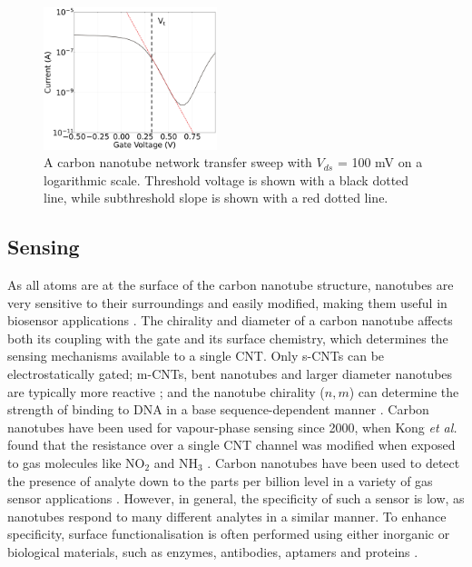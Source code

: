 \documentclass[
  a4paper,
]{scrbook}
\begin{document}
\begin{figure}

{\centering \includegraphics[width=0.45\textwidth,height=\textheight]{figures/ch2/NTQ31C5ch1subthreshold_slope_alt.png}

}

\caption[Liquid-gated transfer characteristics of a CNT FET channel on a
logarithmic scale, showing subthreshold slope and threshold
voltage.]{\label{fig-subthreshold-slope}A carbon nanotube network
transfer sweep with \(V_{ds}\) = 100 mV on a logarithmic scale.
Threshold voltage is shown with a black dotted line, while subthreshold
slope is shown with a red dotted line.}

\end{figure}

\hypertarget{sec-CNT-sensing-mechanisms}{%
\subsection{Sensing}\label{sec-CNT-sensing-mechanisms}}

As all atoms are at the surface of the carbon nanotube structure,
nanotubes are very sensitive to their surroundings and easily modified,
making them useful in biosensor applications
\autocite{Cao2009,Yao2021,Shkodra2021}. The chirality and diameter of a
carbon nanotube affects both its coupling with the gate and its surface
chemistry, which determines the sensing mechanisms available to a single
CNT. Only s-CNTs can be electrostatically gated; m-CNTs, bent nanotubes
and larger diameter nanotubes are typically more reactive
\autocite{Cao2009,Zhao2012,Chhikara2013,Li2023}; and the nanotube
chirality (\(n, m\)) can determine the strength of binding to DNA in a
base sequence-dependent manner \autocite{Rouhi2011a}. Carbon nanotubes
have been used for vapour-phase sensing since 2000, when Kong \emph{et
al.} found that the resistance over a single CNT channel was modified
when exposed to gas molecules like NO\(_2\) and NH\(_3\)
\autocite{Kong2000}. Carbon nanotubes have been used to detect the
presence of analyte down to the parts per billion level in a variety of
gas sensor applications \autocite{Chen2019,Yao2021}. However, in
general, the specificity of such a sensor is low, as nanotubes respond
to many different analytes in a similar manner. To enhance specificity,
surface functionalisation is often performed using either inorganic or
biological materials, such as enzymes, antibodies, aptamers and proteins
\autocite{Cao2009,Shkodra2021,Yao2021}.
\end{document}
